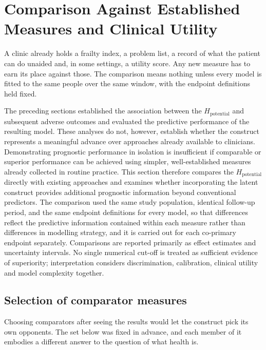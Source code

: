 \section{Comparison Against Established Measures and Clinical Utility}
\label{sec:comparison}

\noindent A clinic already holds a frailty index, a problem list, a record of what the patient can do unaided and, in some settings, a utility score. Any new measure has to earn its place against those. The comparison means nothing unless every model is fitted to the same people over the same window, with the endpoint definitions held fixed.

\noindent The preceding sections established the association between the $H_{\text{potential}}$ and subsequent adverse outcomes and evaluated the predictive performance of the resulting model. These analyses do not, however, establish whether the construct represents a meaningful advance over approaches already available to clinicians. Demonstrating prognostic performance in isolation is insufficient if comparable or superior performance can be achieved using simpler, well-established measures already collected in routine practice. This section therefore compares the $H_{\text{potential}}$ directly with existing approaches and examines whether incorporating the latent construct provides additional prognostic information beyond conventional predictors. The comparison used the same study population, identical follow-up period, and the same endpoint definitions for every model, so that differences reflect the predictive information contained within each measure rather than differences in modelling strategy, and it is carried out for each co-primary endpoint separately. Comparisons are reported primarily as effect estimates and uncertainty intervals. No single numerical cut-off is treated as sufficient evidence of superiority; interpretation considers discrimination, calibration, clinical utility and model complexity together.

\subsection{Selection of comparator measures}
\label{sec:prog-comparators}

\noindent Choosing comparators after seeing the results would let the construct pick its own opponents. The set below was fixed in advance, and each member of it embodies a different answer to the question of what health is.

